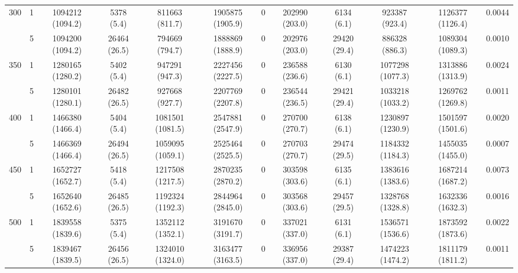\begin{tabular}{llcccccccccc}
\multirow[c]{2}{*}{300} & 1 & 1094212 (1094.2) & 5378 (5.4) & 811663 (811.7) & 1905875 (1905.9) & 0 & 202990 (203.0) & 6134 (6.1) & 923387 (923.4) & 1126377 (1126.4) & 0.0044 \\
 & 5 & 1094200 (1094.2) & 26464 (26.5) & 794669 (794.7) & 1888869 (1888.9) & 0 & 202976 (203.0) & 29420 (29.4) & 886328 (886.3) & 1089304 (1089.3) & 0.0010 \\
\multirow[c]{2}{*}{350} & 1 & 1280165 (1280.2) & 5402 (5.4) & 947291 (947.3) & 2227456 (2227.5) & 0 & 236588 (236.6) & 6130 (6.1) & 1077298 (1077.3) & 1313886 (1313.9) & 0.0024 \\
 & 5 & 1280101 (1280.1) & 26482 (26.5) & 927668 (927.7) & 2207769 (2207.8) & 0 & 236544 (236.5) & 29421 (29.4) & 1033218 (1033.2) & 1269762 (1269.8) & 0.0011 \\
\multirow[c]{2}{*}{400} & 1 & 1466380 (1466.4) & 5404 (5.4) & 1081501 (1081.5) & 2547881 (2547.9) & 0 & 270700 (270.7) & 6138 (6.1) & 1230897 (1230.9) & 1501597 (1501.6) & 0.0020 \\
 & 5 & 1466369 (1466.4) & 26494 (26.5) & 1059095 (1059.1) & 2525464 (2525.5) & 0 & 270703 (270.7) & 29474 (29.5) & 1184332 (1184.3) & 1455035 (1455.0) & 0.0007 \\
\multirow[c]{2}{*}{450} & 1 & 1652727 (1652.7) & 5418 (5.4) & 1217508 (1217.5) & 2870235 (2870.2) & 0 & 303598 (303.6) & 6135 (6.1) & 1383616 (1383.6) & 1687214 (1687.2) & 0.0073 \\
 & 5 & 1652640 (1652.6) & 26485 (26.5) & 1192324 (1192.3) & 2844964 (2845.0) & 0 & 303568 (303.6) & 29457 (29.5) & 1328768 (1328.8) & 1632336 (1632.3) & 0.0016 \\
\multirow[c]{2}{*}{500} & 1 & 1839558 (1839.6) & 5375 (5.4) & 1352112 (1352.1) & 3191670 (3191.7) & 0 & 337021 (337.0) & 6131 (6.1) & 1536571 (1536.6) & 1873592 (1873.6) & 0.0022 \\
 & 5 & 1839467 (1839.5) & 26456 (26.5) & 1324010 (1324.0) & 3163477 (3163.5) & 0 & 336956 (337.0) & 29387 (29.4) & 1474223 (1474.2) & 1811179 (1811.2) & 0.0011 \\
\bottomrule
\end{tabular}
